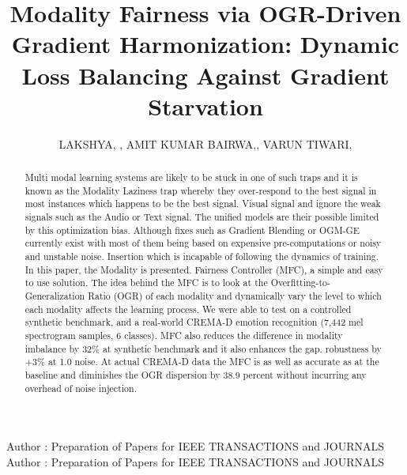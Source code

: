\documentclass{ieeeaccess}
\begin{document}
	
	\title{Modality Fairness via OGR-Driven Gradient Harmonization: Dynamic Loss Balancing Against Gradient Starvation}
	\author{\uppercase{Lakshya}, , \uppercase{Amit Kumar Bairwa},,  \uppercase{Varun Tiwari},}
    
	\address[1,2,3]{Department of Artificial Intelligence and Machine Learning, School of Computer Science and Engineering, Manipal University Jaipur, Jaipur-Ajmer Express Highway, Jaipur, India}
	
	\markboth
	{Author \headeretal: Preparation of Papers for IEEE TRANSACTIONS and JOURNALS}
	{Author \headeretal: Preparation of Papers for IEEE TRANSACTIONS and JOURNALS}
	

	
	\begin{abstract}
Multi modal learning systems are likely to be stuck in one of such traps and it is known as the Modality Laziness trap whereby they over-respond to the best signal in most instances which happens to be the best signal. Visual signal and ignore the weak signals such as the Audio or Text signal. The unified models are their possible limited by this optimization bias. Although fixes such as Gradient Blending or OGM-GE currently exist with most of them being based on expensive pre-computations or noisy and unstable noise. Insertion which is incapable of following the dynamics of training. In this paper, the Modality is presented. Fairness Controller (MFC), a simple and easy to use solution. The idea behind the MFC is to look at the Overfitting-to-Generalization Ratio (OGR) of each modality and dynamically vary the level to which each modality affects the learning process. We were able to test on a controlled synthetic benchmark, and a real-world CREMA-D emotion recognition (7,442 mel spectrogram samples, 6 classes). MFC also reduces the difference in modality imbalance by 32\% at synthetic benchmark and it also enhances the gap. robustness by $+3\%$ at 1.0 noise. At actual CREMA-D data the MFC is as well as accurate as at the baseline and diminishes the OGR dispersion by 38.9 percent without incurring any overhead of noise injection.
	\end{abstract}
	
\end{document}
